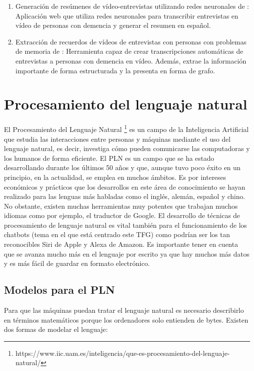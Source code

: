 \begin{enumerate}
	\item Generación de resúmenes de vídeo-entrevistas utilizando redes neuronales de \cite{dalcazar}: Aplicación web que utiliza redes neuronales para transcribir entrevistas en vídeo de personas con demencia y generar el resumen en español.
	\item Extracción de recuerdos de vídeos de entrevistas con personas con problemas de memoria de \cite{hgarcia}: Herramienta capaz de crear transcripciones automáticas de entrevistas a personas con demencia en vídeo. Además, extrae la información importante de forma estructurada y la presenta en forma de grafo. 
\end{enumerate}

\section{Procesamiento del lenguaje natural}

El Procesamiento del Lenguaje Natural \footnote{https://www.iic.uam.es/inteligencia/que-es-procesamiento-del-lenguaje-natural/} es un campo de la Inteligencia Artificial que estudia las interacciones entre personas y máquinas mediante el uso del lenguaje natural, es decir, investiga cómo pueden comunicarse las computadoras y los humanos de forma eficiente. El PLN es un campo que se ha estado desarrollando durante los últimos 50 años y que, aunque tuvo poco éxito en un principio, en la actualidad, se emplea en muchos ámbitos. Es por intereses económicos y prácticos que los desarrollos en este área de conocimiento se hayan realizado para las lenguas más habladas como el inglés, alemán, español y chino. No obstante, existen muchas herramientas muy potentes que trabajan muchos idiomas como por ejemplo, el traductor de Google. El desarrollo de técnicas de procesamiento de lenguaje natural es vital también para el funcionamiento de los chatbots (tema en el que está centrado este TFG) como podrían ser los tan reconocibles Siri de Apple y Alexa de Amazon. Es importante tener en cuenta que se avanza mucho más en el lenguaje por escrito ya que hay muchos más datos y es más fácil de guardar en formato electrónico.


\subsection{Modelos para el PLN}

Para que las máquinas puedan tratar el lenguaje natural es necesario describirlo en términos matemáticos porque los ordenadores solo entienden de bytes. Existen dos formas de modelar el lenguaje:

